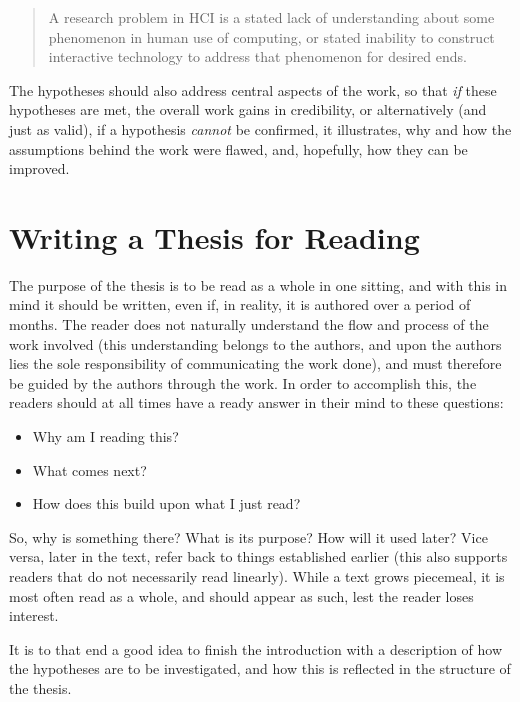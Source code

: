 \begin{quote}
  A research problem in HCI is a stated lack of understanding about some
  phenomenon in human use of computing, or stated inability to construct
  interactive technology to address that phenomenon for desired
  ends.~\cite[Def.\ 1]{Oulasvirta2016:POT2CCOHFICS2016}
\end{quote}


The hypotheses should also address central aspects of the work, so that
\emph{if} these hypotheses are met, the overall work gains in credibility,
or alternatively (and just as valid), if a hypothesis \emph{cannot} be
confirmed, it illustrates, why and how the assumptions behind the work were
flawed, and, hopefully, how they can be improved.


\section{Writing a Thesis for Reading}
\label{sec:writ-thes-read}

The purpose of the thesis is to be read as a whole in one sitting, and with
this in mind it should be written, even if, in reality, it is authored over
a period of months.  The reader does not naturally understand the flow and
process of the work involved (this understanding belongs to the authors, and
upon the authors lies the sole responsibility of communicating the work
done), and must therefore be guided by the authors through the work.  In
order to accomplish this, the readers should at all times have a ready
answer in their mind to these questions:

\begin{itemize}
\item Why am I reading this?
\item What comes next?
\item How does this build upon what I just read?
\end{itemize}

So, why is something there? What is its purpose? How will it used later?
Vice versa, later in the text, refer back to things established earlier
(this also supports readers that do not necessarily read linearly). While a
text grows piecemeal, it is most often read as a whole, and should appear as
such, lest the reader loses interest.

It is to that end a good idea to finish the introduction with a description
of how the hypotheses are to be investigated, and how this is reflected in
the structure of the thesis.

